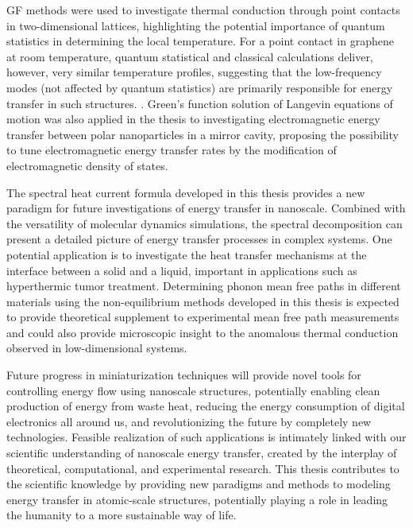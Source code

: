 GF methods were used to investigate thermal conduction through point contacts in two-dimensional lattices, highlighting the potential importance of quantum statistics in determining the local temperature. For a point contact in graphene at room temperature, quantum statistical and classical calculations deliver, however, very similar temperature profiles, suggesting that the low-frequency modes (not affected by quantum statistics) are primarily responsible for energy transfer in such structures.  \cite{chen01}.  Green's function solution of Langevin equations of motion was also applied in the thesis to investigating electromagnetic energy transfer between polar nanoparticles in a mirror cavity, proposing the possibility to tune electromagnetic energy transfer rates by the modification of electromagnetic density of states. 

The spectral heat current formula developed in this thesis provides a new paradigm for future investigations of energy transfer in nanoscale. Combined with the versatility of molecular dynamics simulations, the spectral decomposition can present a detailed picture of energy transfer processes in complex systems. One potential application is to investigate the heat transfer mechanisms at the interface between a solid and a liquid, important in applications such as hyperthermic tumor treatment. Determining phonon mean free paths in different materials using the non-equilibrium methods developed in this thesis is expected to provide theoretical supplement to experimental mean free path measurements and could also provide microscopic insight to the anomalous thermal conduction observed in low-dimensional systems.

Future progress in miniaturization techniques will provide novel tools for controlling energy flow using nanoscale structures, potentially enabling clean production of energy from waste heat, reducing the energy consumption of digital electronics all around us, and revolutionizing the future by completely new technologies. Feasible realization of such applications is intimately linked with our scientific understanding of nanoscale energy transfer, created by the interplay of theoretical, computational, and experimental research. This thesis contributes to the scientific knowledge by providing new paradigms and methods to modeling energy transfer in atomic-scale structures, potentially playing a role in leading the humanity to a more sustainable way of life. 
